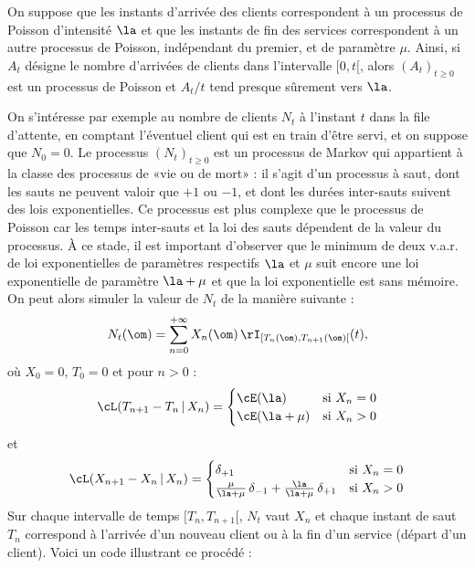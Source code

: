 {{On suppose que les instants d'arrivée des clients correspondent à un processus
de Poisson d'intensité $\la$ et que les instants de fin des services
correspondent à un autre processus de Poisson, indépendant du premier, et de
paramètre $\mu$.  Ainsi, si $A_t$ désigne le nombre d'arrivées de clients dans
l'intervalle $[0,t[$, alors $(A_t)_{t\geq 0}$ est un processus de Poisson et
$A_t/t$ tend presque sûrement vers $\la$.

On s'intéresse par exemple au nombre de clients $N_t$ à l'instant $t$ dans la
file d'attente, en comptant l'éventuel client qui est en train d'être servi,
et on suppose que $N_0=0$. Le processus $(N_t)_{t\geq0}$ est un processus de
Markov qui appartient à la classe des processus de «vie ou de mort» : il
s'agit d'un processus à saut, dont les sauts ne peuvent valoir que $+1$ ou
$-1$, et dont les durées inter-sauts suivent des lois exponentielles. Ce
processus est plus complexe que le processus de Poisson car les temps
inter-sauts et la loi des sauts dépendent de la valeur du processus. À ce
stade, il est important d'observer que le minimum de deux v.a.r. de loi
exponentielles de paramètres respectifs $\la$ et $\mu$ suit encore une loi
exponentielle de paramètre $\la+\mu$ et que la loi exponentielle est sans
mémoire.  On peut alors simuler la valeur de $N_t$ de la manière suivante :
$$
N_t(\om)=\sum_{n=0}^{+\infty} X_n(\om)
\,\rI_{[T_n(\om),T_{n+1}(\om)[}(t),
$$
où $X_0=0$, $T_0=0$ et pour $n>0$ :
$$
\cL(T_{n+1}-T_{n}\,\vert\,X_n)=
\begin{cases}
\cE(\la) & \text{si $X_n=0$} \\
\cE(\la+\mu) & \text{si $X_n>0$}
\end{cases}
$$
et 
$$
\cL(X_{n+1}-X_n\,\vert\,X_n)=
\begin{cases}
\delta_{+1} & \text{si $X_n=0$} \\
\frac{\mu}{\la+\mu}\,\delta_{-1}+\frac{\la}{\la+\mu}\,\delta_{+1} & \text{si $X_n>0$}
\end{cases}
$$
Sur chaque intervalle de temps $[T_n,T_{n+1}[$, $N_t$ vaut $X_n$ et chaque
instant de saut $T_n$ correspond à l'arrivée d'un nouveau client ou à la fin
d'un service (départ d'un client). Voici un code \ML{} illustrant ce procédé :


}}
